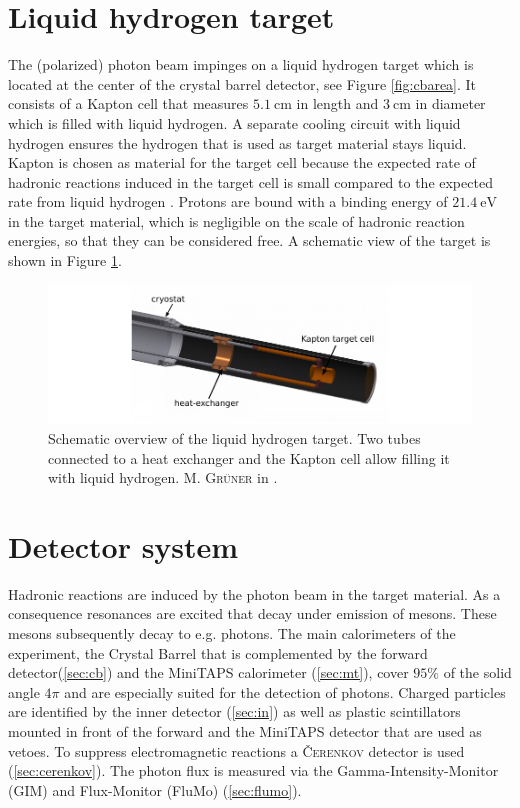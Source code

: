 \section{Liquid hydrogen target}
\label{sec:tar}
The (polarized) photon beam impinges on a liquid hydrogen target \cite{hammannphd} which is located at the center of the crystal barrel detector, see Figure \ref{fig:cbarea}. It consists of a Kapton cell that measures $\SI{5.1}{\centi\m}$ in length and $\SI{3}{\centi\m}$ in diameter which is filled with liquid hydrogen. A separate cooling circuit with liquid hydrogen ensures the hydrogen that is used as target material stays liquid. Kapton is chosen as material for the target cell because the expected rate of hadronic reactions induced in the target cell is small compared to the expected rate from liquid hydrogen \cite{hammannphd}. Protons are bound with a binding energy of $\SI{21.4}{\eV}$ in the target material, which is negligible on the scale of hadronic reaction energies, so that they can be considered free. A schematic view of the target is shown in Figure \ref{fig:target}.
\begin{figure}[htbp]
	\centering
	\includegraphics[width=\linewidth]{figs/Target.pdf}
	\caption{Schematic overview of the liquid hydrogen target. Two tubes connected to a heat exchanger and the Kapton cell allow filling it with liquid hydrogen. \textsc{M. Grüner} in \cite{farahphd}.}
	\label{fig:target}
\end{figure}
\section{Detector system}
\label{sec:cal}
Hadronic reactions are induced by the photon beam in the target material. As a consequence resonances are excited that decay under emission of mesons. These mesons subsequently decay to e.g. photons. The main calorimeters of the experiment, the Crystal Barrel that is complemented by the forward detector(\ref{sec:cb}) and the MiniTAPS calorimeter (\ref{sec:mt}), cover $95\%$ of the solid angle $4\pi$ and are especially suited for the detection of photons. Charged particles are identified by the inner detector (\ref{sec:in}) as well as plastic scintillators mounted in front of the forward and the MiniTAPS detector that are used as vetoes. To suppress electromagnetic reactions a \textsc{\v Cerenkov} detector is used (\ref{sec:cerenkov}). The photon flux is measured via the Gamma-Intensity-Monitor (GIM) and Flux-Monitor (FluMo) (\ref{sec:flumo}).

